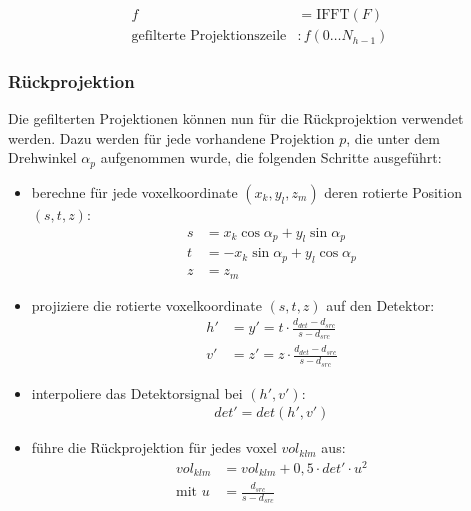 \begin{equation}
    \begin{aligned}
        f &= \text{IFFT}(F)\\
        \text{gefilterte Projektionszeile} &: f(0 \dots N_{h - 1})
    \end{aligned}
\end{equation}

\subsubsection{Rückprojektion}\label{sssec:backprojection}

Die gefilterten Projektionen können nun für die Rückprojektion verwendet werden. Dazu werden für jede vorhandene
Projektion $p$, die unter dem Drehwinkel $\alpha_p$ aufgenommen wurde, die folgenden Schritte ausgeführt:

\begin{itemize}
    \item berechne für jede \gls{voxel}koordinate $(x_k, y_l, z_m)$ deren rotierte Position $(s, t, z)$:
        \begin{equation}
            \begin{aligned}
                s &= x_k \cos \alpha_p + y_l \sin \alpha_p\\
                t &= -x_k \sin \alpha_p + y_l \cos \alpha_p\\
                z &= z_m
            \end{aligned}
        \end{equation}

    \item projiziere die rotierte \gls{voxel}koordinate $(s, t, z)$ auf den Detektor:
        \begin{equation}
            \begin{aligned}
                h' &= y' = t \cdot \frac{d_{det} - d_{src}}{s - d_{src}}\\
                v' &= z' = z \cdot \frac{d_{det} - d_{src}}{s - d_{src}}
            \end{aligned}
        \end{equation}

    \item interpoliere das Detektorsignal bei $(h', v')$:
        \begin{equation}
            \begin{aligned}
                det' = det(h', v')
            \end{aligned}
        \end{equation}

    \item führe die Rückprojektion für jedes \gls{voxel} $vol_{klm}$ aus:
        \begin{equation}
            \begin{aligned}
                vol_{klm} &= vol_{klm} + 0,5 \cdot det' \cdot u^2\\
                \text{mit } u &= \frac{d_{src}}{s - d_{src}}
            \end{aligned}
        \end{equation}
\end{itemize}

